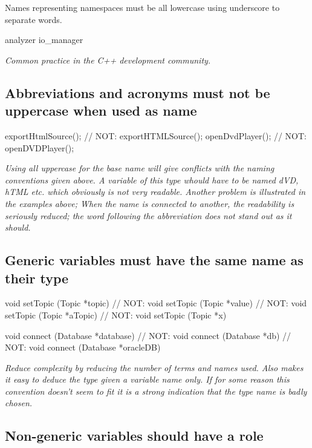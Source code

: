 \documentclass[a4paper,11pt,oneside]{scrbook}
\newcommand{\guideline}[1]{{\subsection{#1}}}
\newcommand{\motivation}[1]{{\normalfont \itshape #1}}
\begin{document}
Names representing namespaces must be all lowercase using underscore to separate
words.

\begin{code}
  analyzer
  io_manager
\end{code}

\motivation{
  Common practice in the C++ development community.
}

\guideline{Abbreviations and acronyms must not be uppercase when used as name}

\begin{code}
  exportHtmlSource();   // NOT: exportHTMLSource();
  openDvdPlayer();      // NOT: openDVDPlayer(); 
\end{code}

\motivation{ 
  Using all uppercase for the base name will give conflicts with the naming
  conventions given above. A variable of this type whould have to be named dVD,
  hTML etc. which obviously is not very readable. Another problem is illustrated
  in the examples above; When the name is connected to another, the readability
  is seriously reduced; the word following the abbreviation does not stand out
  as it should.
}

\guideline{Generic variables must have the same name as their type}

\begin{code}
  void setTopic (Topic *topic)  // NOT: void setTopic (Topic *value)
                                // NOT: void setTopic (Topic *aTopic) 
                                // NOT: void setTopic (Topic *x) 

  void connect (Database *database)  // NOT: void connect (Database *db)
                                     // NOT: void connect (Database *oracleDB) 
\end{code}

\motivation{ 
  Reduce complexity by reducing the number of terms and names used. Also makes
  it easy to deduce the type given a variable name only. If for some reason this
  convention doesn't seem to fit it is a strong indication that the type name is
  badly chosen.
}

\guideline{Non-generic variables should have a role}
\end{document}
